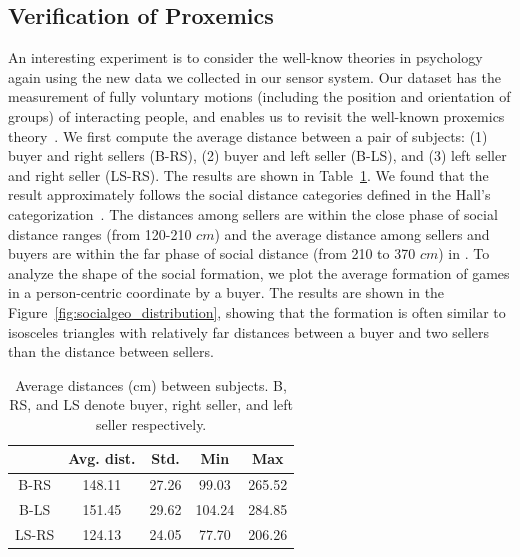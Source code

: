 \subsection{Verification of Proxemics}
An interesting experiment is to consider the well-know theories in psychology again using the new data we collected in our sensor system. Our dataset has the measurement of fully voluntary motions (including the position and orientation of groups) of interacting people, and enables us to revisit the well-known proxemics theory~\cite{Hall66}. We first compute the average distance between a pair of subjects: (1) buyer and right sellers (B-RS), (2) buyer and left seller (B-LS), and (3) left seller and right seller (LS-RS). The results are shown in Table~\ref{table:proxemics_comp}. We found that the result approximately follows the social distance categories defined in the Hall's categorization~\cite{Hall66}. The distances among sellers are within the close phase of social distance ranges (from 120-210 $cm$) and the average distance among sellers and buyers are within the far phase of social distance (from 210 to 370 $cm$) in \cite{Hall66}. To analyze the shape of the social formation, we plot the average formation of games in a person-centric coordinate by a buyer. The results are shown in the Figure~\ref{fig:socialgeo_distribution}, showing that the formation is often similar to isosceles triangles with relatively far distances between a buyer and two sellers than the distance between sellers. 


\begin{table}[t]
	\centering
	\caption{Average distances (cm) between subjects. B, RS, and LS denote buyer, right seller, and left seller respectively.}
	\label{table:proxemics_comp}
	\begin{tabular}{c| c| c| c| c}
		\hline
		& Avg. dist. & Std. & Min & Max \\
		\hline
		B-RS & 148.11 & 27.26 & 99.03 & 265.52 \\
		\hline
		B-LS & 151.45 & 29.62 & 104.24  & 284.85 \\
		\hline
		LS-RS & 124.13 & 24.05  & 77.70  & 206.26 \\
		\hline
	\end{tabular}
\end{table}


